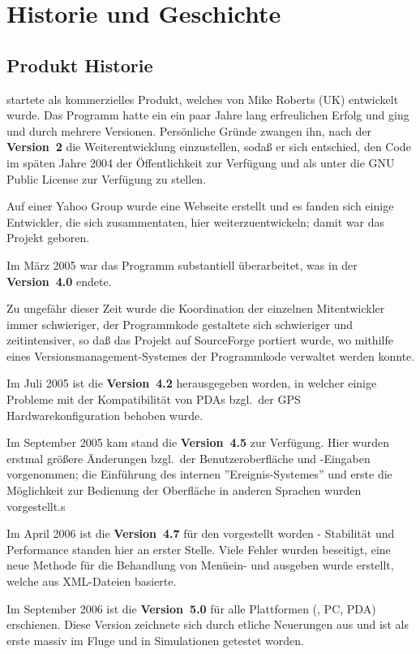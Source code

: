 \chapter{Historie und Geschichte}\label{cha:history-development}
\section{Produkt Historie}

\xc startete als kommerzielles Produkt, welches von Mike Roberts (UK) entwickelt wurde.
Das Programm hatte ein ein paar Jahre lang erfreulichen Erfolg und ging und durch mehrere Versionen.
Persönliche Gründe zwangen ihn, nach der  {\bf Version~2} die Weiterentwicklung einzustellen, sodaß
er sich entschied, den Code im späten Jahre 2004 der Öffentlichkeit zur Verfügung und  als
 unter die  GNU Public License  zur Verfügung zu stellen.

Auf einer Yahoo Group wurde eine Webseite erstellt und es fanden sich einige Entwickler, die sich zusammentaten,
hier weiterzuentwickeln; damit war das Projekt geboren.

Im März 2005 war das Programm substantiell überarbeitet, was in der {\bf Version~4.0} endete.

Zu ungefähr dieser Zeit wurde die Koordination der einzelnen Mitentwickler immer schwieriger, der Programmkode gestaltete sich
schwieriger und zeitintensiver, so daß das Projekt auf SourceForge portiert wurde, wo mithilfe eines Versionsmanagement-Systemes
der Programmkode  verwaltet werden konnte.

Im Juli 2005 ist die  {\bf Version~4.2} herausgegeben worden, in welcher einige Probleme mit der Kompatibilität von PDAs bzgl.\
der GPS Hardwarekonfiguration behoben wurde.

Im September 2005 kam stand die {\bf Version~4.5} zur Verfügung. Hier wurden erstmal größere Änderungen bzgl.\ der Benutzeroberfläche
und -Eingaben vorgenommen; die Einführung  des internen ''Ereignis-Systemes'' und erste die Möglichkeit zur Bedienung der
Oberfläche in anderen Sprachen   wurden vorgestellt.s

Im April 2006 ist die {\bf Version~4.7} für den \al vorgestellt worden - Stabilität und Performance standen hier an erster Stelle.
Viele Fehler wurden beseitigt, eine neue Methode für die Behandlung von Menüein- und ausgeben wurde erstellt,
welche aus XML-Dateien basierte.

Im September 2006 ist die  {\bf Version~5.0} für alle Plattformen (\al, PC, PDA) erschienen.
Diese Version zeichnete sich durch etliche Neuerungen aus und ist als erste massiv im Fluge und in
Simulationen getestet  worden.

